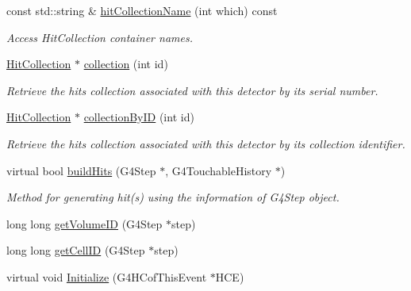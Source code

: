 \begin{DoxyCompactItemize}
const std\+::string \& \hyperlink{class_d_d4hep_1_1_simulation_1_1_geant4_sensitive_detector_a5959c9da6bc6498e5a443b8553e6f573}{hit\+Collection\+Name} (int which) const
\begin{DoxyCompactList}\small\item\em Access Hit\+Collection container names. \end{DoxyCompactList}\item 
\hyperlink{class_d_d4hep_1_1_simulation_1_1_geant4_sensitive_detector_a4865cf9c96edfef8cd41e309a4cd6211}{Hit\+Collection} $\ast$ \hyperlink{class_d_d4hep_1_1_simulation_1_1_geant4_sensitive_detector_a29e835271c9efa731bba49c64790281b}{collection} (int id)
\begin{DoxyCompactList}\small\item\em Retrieve the hits collection associated with this detector by its serial number. \end{DoxyCompactList}\item 
\hyperlink{class_d_d4hep_1_1_simulation_1_1_geant4_sensitive_detector_a4865cf9c96edfef8cd41e309a4cd6211}{Hit\+Collection} $\ast$ \hyperlink{class_d_d4hep_1_1_simulation_1_1_geant4_sensitive_detector_a45d013173dd5a1b159e2bb2bfca12d56}{collection\+By\+ID} (int id)
\begin{DoxyCompactList}\small\item\em Retrieve the hits collection associated with this detector by its collection identifier. \end{DoxyCompactList}\item 
virtual bool \hyperlink{class_d_d4hep_1_1_simulation_1_1_geant4_sensitive_detector_a96d4594c8e1af23ef5c572938460670e}{build\+Hits} (G4\+Step $\ast$, G4\+Touchable\+History $\ast$)
\begin{DoxyCompactList}\small\item\em Method for generating hit(s) using the information of G4\+Step object. \end{DoxyCompactList}\item 
long long \hyperlink{class_d_d4hep_1_1_simulation_1_1_geant4_sensitive_detector_adb27c3e691e051044fbf1bd06cd70cac}{get\+Volume\+ID} (G4\+Step $\ast$step)
\item 
long long \hyperlink{class_d_d4hep_1_1_simulation_1_1_geant4_sensitive_detector_a02a92ee533ee2067bc629f7a8b123c89}{get\+Cell\+ID} (G4\+Step $\ast$step)
\item 
virtual void \hyperlink{class_d_d4hep_1_1_simulation_1_1_geant4_sensitive_detector_a7ee158e29937473f04db1cc6c7284923}{Initialize} (G4\+H\+Cof\+This\+Event $\ast$H\+CE)

\end{DoxyCompactItemize}
